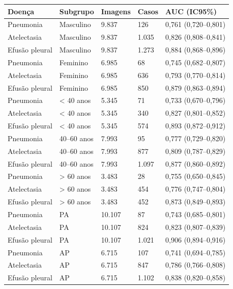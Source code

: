\begin{tabular}{lllll}
\toprule
Doença & Subgrupo & Imagens & Casos & AUC (IC95\%) \\
\midrule
Pneumonia & Masculino & 9.837 & 126 & 0,761 (0,720–0,801) \\
Atelectasia & Masculino & 9.837 & 1.035 & 0,826 (0,808–0,841) \\
Efusão pleural & Masculino & 9.837 & 1.273 & 0,884 (0,868–0,896) \\
Pneumonia & Feminino & 6.985 & 68 & 0,745 (0,682–0,807) \\
Atelectasia & Feminino & 6.985 & 636 & 0,793 (0,770–0,814) \\
Efusão pleural & Feminino & 6.985 & 850 & 0,879 (0,863–0,894) \\
Pneumonia & < 40 anos & 5.345 & 71 & 0,733 (0,670–0,796) \\
Atelectasia & < 40 anos & 5.345 & 340 & 0,827 (0,801–0,852) \\
Efusão pleural & < 40 anos & 5.345 & 574 & 0,893 (0,872–0,912) \\
Pneumonia & 40–60 anos & 7.993 & 95 & 0,777 (0,729–0,820) \\
Atelectasia & 40–60 anos & 7.993 & 877 & 0,809 (0,787–0,829) \\
Efusão pleural & 40–60 anos & 7.993 & 1.097 & 0,877 (0,860–0,892) \\
Pneumonia & > 60 anos & 3.483 & 28 & 0,755 (0,650–0,845) \\
Atelectasia & > 60 anos & 3.483 & 454 & 0,776 (0,747–0,804) \\
Efusão pleural & > 60 anos & 3.483 & 452 & 0,873 (0,849–0,893) \\
Pneumonia & PA & 10.107 & 87 & 0,743 (0,685–0,801) \\
Atelectasia & PA & 10.107 & 824 & 0,823 (0,807–0,839) \\
Efusão pleural & PA & 10.107 & 1.021 & 0,906 (0,894–0,916) \\
Pneumonia & AP & 6.715 & 107 & 0,741 (0,694–0,785) \\
Atelectasia & AP & 6.715 & 847 & 0,786 (0,766–0,808) \\
Efusão pleural & AP & 6.715 & 1.102 & 0,838 (0,820–0,858) \\
\bottomrule
\end{tabular}
